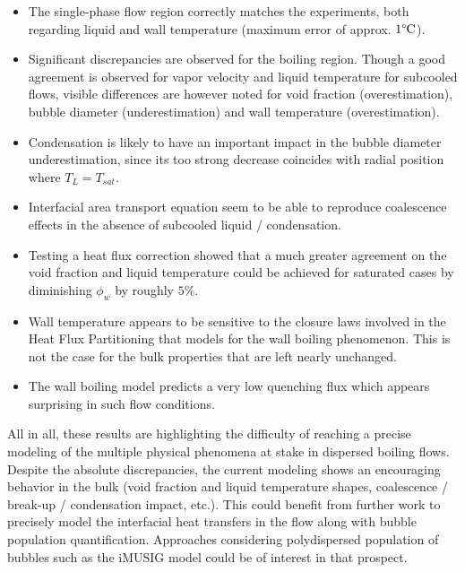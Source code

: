 \begin{itemize}
\item The single-phase flow region correctly matches the experiments, both regarding liquid and wall temperature (maximum error of approx. $1\degree\mathrm{C}$).

\item Significant discrepancies are observed for the boiling region. Though a good agreement is observed for vapor velocity and liquid temperature for subcooled flows, visible differences are however noted for void fraction (overestimation), bubble diameter (underestimation) and wall temperature (overestimation). 

\item Condensation is likely to have an important impact in the bubble diameter underestimation, since its too strong decrease coincides with radial position where $T_{L}=T_{sat}$. 

\item Interfacial area transport equation seem to be able to reproduce coalescence effects in the absence of subcooled liquid / condensation.


\item Testing a heat flux correction showed that a much greater agreement on the void fraction and liquid temperature could be achieved for saturated cases by diminishing $\phi_{w}$ by roughly $5\%$.

\item Wall temperature appears to be sensitive to the closure laws involved in the Heat Flux Partitioning that models for the wall boiling phenomenon. This is not the case for the bulk properties that are left nearly unchanged.

\item The wall boiling model predicts a very low quenching flux which appears surprising in such flow conditions. 


\end{itemize} 

All in all, these results are highlighting the difficulty of reaching a precise modeling of the multiple physical phenomena at stake in dispersed boiling flows. Despite the absolute discrepancies, the current modeling shows an encouraging behavior in the bulk (void fraction and liquid temperature shapes, coalescence / break-up / condensation impact, etc.). This could benefit from further work to precisely model the interfacial heat transfers in the flow along with bubble population quantification. Approaches considering polydispersed population of bubbles such as the iMUSIG model \cite{krepper_2008} could be of interest in that prospect.

